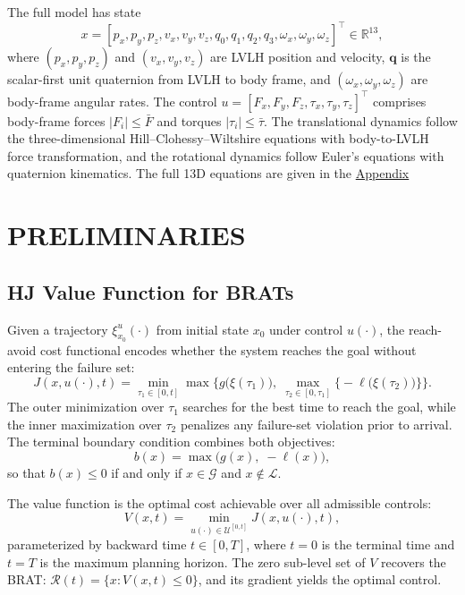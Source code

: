 \documentclass[letterpaper, 10 pt, conference]{ieeeconf}
\begin{document}
The full model has state
\begin{equation}\label{eq:state13d}
x = [p_x, p_y, p_z, v_x, v_y, v_z, q_0, q_1, q_2, q_3, \omega_x, \omega_y, \omega_z]^\top \!\in\! \mathbb{R}^{13}\!,
\end{equation}
where $(p_x, p_y, p_z)$ and $(v_x, v_y, v_z)$ are LVLH position and velocity, $\mathbf{q}$ is the scalar-first unit quaternion from LVLH to body frame, and $(\omega_x, \omega_y, \omega_z)$ are body-frame angular rates. The control $u = [F_x, F_y, F_z, \tau_x, \tau_y, \tau_z]^\top$ comprises body-frame forces $|F_i| \leq \bar{F}$ and torques $|\tau_i| \leq \bar{\tau}$. The translational dynamics follow the three-dimensional Hill--Clohessy--Wiltshire equations with body-to-LVLH force transformation, and the rotational dynamics follow Euler's equations with quaternion kinematics. The full 13D equations are given in the \hyperref[sec:appendix]{Appendix}

\section{PRELIMINARIES}

\subsection{HJ Value Function for BRATs}

Given a trajectory $\xi_{x_0}^u(\cdot)$ from initial state $x_0$ under control $u(\cdot)$, the reach-avoid cost functional encodes whether the system reaches the goal without entering the failure set:
\begin{equation}\label{eq:cost}
J(x, u(\cdot), t) = \min_{\tau_1 \in [0,t]} \max\!\Big\{g\!\big(\xi(\tau_1)\big),\; \max_{\tau_2 \in [0,\tau_1]} \big\{-\ell\!\big(\xi(\tau_2)\big)\big\}\Big\}.
\end{equation}
The outer minimization over $\tau_1$ searches for the best time to reach the goal, while the inner maximization over $\tau_2$ penalizes any failure-set violation prior to arrival. The terminal boundary condition combines both objectives:
\begin{equation}\label{eq:boundary}
b(x) = \max\!\big(g(x),\; -\ell(x)\big),
\end{equation}
so that $b(x) \leq 0$ if and only if $x \in \mathcal{G}$ and $x \notin \mathcal{L}$.

The value function is the optimal cost achievable over all admissible controls:
\begin{equation}\label{eq:valfun}
V(x, t) = \min_{u(\cdot) \in \mathcal{U}^{[0,t]}} J(x, u(\cdot), t),
\end{equation}
parameterized by backward time $t \in [0, T]$, where $t = 0$ is the terminal time and $t = T$ is the maximum planning horizon. The zero sub-level set of $V$ recovers the BRAT: $\mathcal{R}(t) = \{x : V(x, t) \leq 0\}$, and its gradient yields the optimal control.
\end{document}
